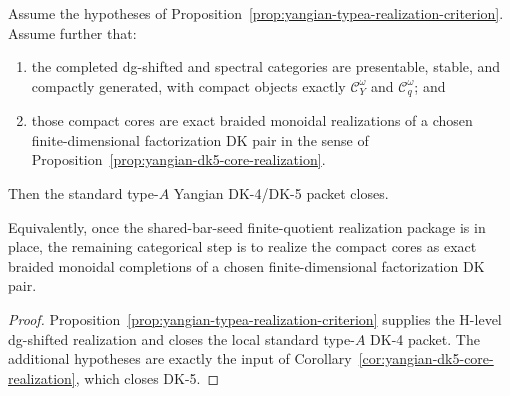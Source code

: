 \begin{corollary}
\label{cor:yangian-typea-realization-plus-core-realization-orig}
Assume the hypotheses of
Proposition~\ref{prop:yangian-typea-realization-criterion}. Assume
further that:
\begin{enumerate}[label=\textup{(\roman*)}]
\item the completed dg-shifted and spectral categories are presentable,
 stable, and compactly generated, with compact objects exactly
 $\mathcal{C}_Y^\omega$ and $\mathcal{C}_q^\omega$; and
\item those compact cores are exact braided monoidal realizations of
 a chosen finite-dimensional factorization DK pair in the sense of
 Proposition~\ref{prop:yangian-dk5-core-realization}.
\end{enumerate}
Then the standard type-$A$ Yangian DK-4/DK-5 packet closes.

Equivalently, once the shared-bar-seed finite-quotient realization
package is in place, the remaining categorical step is to realize the
compact cores as exact braided monoidal completions of a chosen
finite-dimensional factorization DK pair.
\end{corollary}

\begin{proof}
Proposition~\ref{prop:yangian-typea-realization-criterion} supplies the
H-level dg-shifted realization and closes the local standard type-$A$
DK-4 packet. The additional hypotheses are exactly the input of
Corollary~\ref{cor:yangian-dk5-core-realization}, which closes DK-5.
\end{proof}


